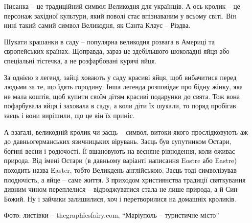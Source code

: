 
Писанка – це традиційний символ Великодня для українців. А ось кролик – це
персонаж західної культури, який поволі стає впізнаваним у всьому світі. Він
нині такий самий символ Великодня, як Санта Клаус – Різдва.

Шукати крашанки в саду – популярна великодня розвага в Америці та європейських
країнах. Щоправда, зараз це здебільшого шоколадні яйця або спеціальні тістечка,
а не розфарбовані курячі яйця.


За однією з легенд, зайці ховають у саду красиві яйця, щоб вибачитися перед
людьми за те, що їдять городину. Інша легенда розповідає про бідну жінку, яка
не мала коштів, щоб купити своїм дітям красиві подарунки до свята. Тож вона
пофарбувала яйця і заховала в саду, а коли діти їх шукали, то поряд пробігав
заєць і вони вирішили, що це він їх приніс.


А взагалі, великодній кролик чи заєць – символ, витоки якого прослідковують аж
до давньогерманських язичницьких вірувань. Заєць був супутником Остари, богині
весни і родючості. Її вшановують на весняне рівнодення, коли оживає природа.
Від імені Остари (в давньому варіанті написання Eostre або Eastre) походить
назва Easter, тобто Великдень англійською. Заєць тоді символізував плодючість,
а яйце – саме життя. З приходом християнства традиції святкування дивним чином
переплелися – відроджуватися стала не лише природа, а й Син Божий. Ну і зайчики
залишилися, хоч і перетворилися на домашніх кроликів.

Фото: листівки – thegraphicsfairy.com, \enquote{Маріуполь – туристичне місто}
